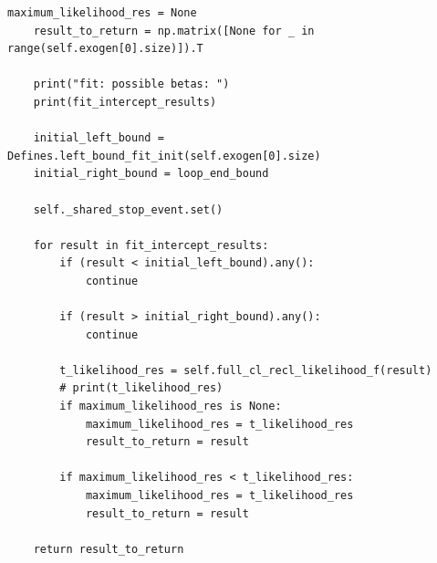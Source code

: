 \documentclass[a4paper,14pt]{extarticle}
\begin{document}
\begin{Verbatim}[fontsize=\scriptsize]
    maximum_likelihood_res = None
    result_to_return = np.matrix([None for _ in range(self.exogen[0].size)]).T

    print("fit: possible betas: ")
    print(fit_intercept_results)

    initial_left_bound = Defines.left_bound_fit_init(self.exogen[0].size)
    initial_right_bound = loop_end_bound

    self._shared_stop_event.set()

    for result in fit_intercept_results:
        if (result < initial_left_bound).any():
            continue

        if (result > initial_right_bound).any():
            continue

        t_likelihood_res = self.full_cl_recl_likelihood_f(result)
        # print(t_likelihood_res)
        if maximum_likelihood_res is None:
            maximum_likelihood_res = t_likelihood_res
            result_to_return = result

        if maximum_likelihood_res < t_likelihood_res:
            maximum_likelihood_res = t_likelihood_res
            result_to_return = result

    return result_to_return
\end{Verbatim}
\newpage
\end{document}
